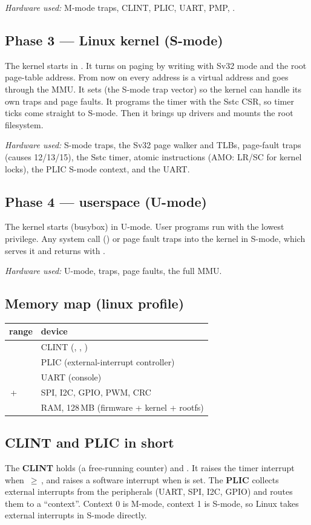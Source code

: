 \emph{Hardware used:} M-mode traps, CLINT, PLIC, UART, PMP, .

\subsection{Phase 3 --- Linux kernel (S-mode)}
The kernel starts in . It turns on paging by writing  with
Sv32 mode and the root page-table address. From now on every address is a virtual
address and goes through the MMU. It sets  (the S-mode trap vector) so
the kernel can handle its own traps and page faults. It programs the timer with
the Sstc  CSR, so timer ticks come straight to S-mode. Then it
brings up drivers and mounts the root filesystem.

\emph{Hardware used:} S-mode traps, the Sv32 page walker and TLBs, page-fault
traps (causes 12/13/15), the Sstc timer, atomic instructions (AMO: LR/SC for
kernel locks), the PLIC S-mode context, and the UART.

\subsection{Phase 4 --- userspace (U-mode)}
The kernel starts  (busybox) in U-mode. User programs run with the
lowest privilege. Any system call () or page fault traps into the
kernel in S-mode, which serves it and returns with .

\emph{Hardware used:} U-mode,  traps, page faults, the full MMU.

\subsection{Memory map (linux profile)}
\begin{center}\small
\begin{tabularx}{\textwidth}{l Y}
\toprule
\textbf{range} & \textbf{device} \\
\midrule
{} & CLINT (, , ) \\
 & PLIC (external-interrupt controller) \\
 & UART (console) \\
\,+ & SPI, I2C, GPIO, PWM, CRC \\
 & RAM, 128\,MB (firmware + kernel + rootfs) \\
\bottomrule
\end{tabularx}
\end{center}

\subsection{CLINT and PLIC in short}
The \textbf{CLINT} holds  (a free-running counter) and
. It raises the timer interrupt when \,$\ge$\,,
and raises a software interrupt when  is set. The \textbf{PLIC}
collects external interrupts from the peripherals (UART, SPI, I2C, GPIO) and
routes them to a ``context''. Context 0 is M-mode, context 1 is S-mode, so Linux
takes external interrupts in S-mode directly.
